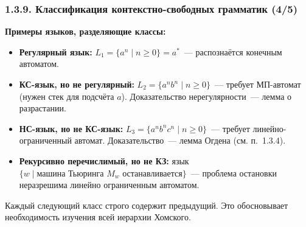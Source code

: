 \documentclass[mathserif,12pt,aspectratio=169]{beamer}
\def\NB#1{{\bf\color{brown}#1}}
\let\ge\geqslant
\begin{document}
\begin{frame}
\frametitle{1.3.9. Классификация контекстно-свободных грамматик (4/5)}

\NB{Примеры языков, разделяющие классы:}

\begin{itemize}
\item \textbf{Регулярный язык:} $L_1 = \{a^n \mid n \ge 0\} = a^*$~--- распознаётся конечным автоматом.

\item \textbf{КС-язык, но не регулярный:} $L_2 = \{a^n b^n \mid n \ge 0\}$~--- 
требует МП-автомат (нужен стек для подсчёта $a$). 
Доказательство нерегулярности~--- лемма о разрастании.

\item \textbf{НС-язык, но не КС-язык:} $L_3 = \{a^n b^n c^n \mid n \ge 0\}$~--- 
требует линейно-ограниченный автомат. 
Доказательство~--- лемма Огдена (см. п.~1.3.4).

\item \textbf{Рекурсивно перечислимый, но не КЗ:} 
язык $\{w \mid \text{машина Тьюринга } M_w \text{ останавливается}\}$~--- 
проблема остановки неразрешима линейно ограниченным автоматом.
\end{itemize}

\begin{digress}
Каждый следующий класс строго содержит предыдущий. 
Это обосновывает необходимость изучения всей иерархии Хомского.
\end{digress}

\end{frame}
\end{document}

